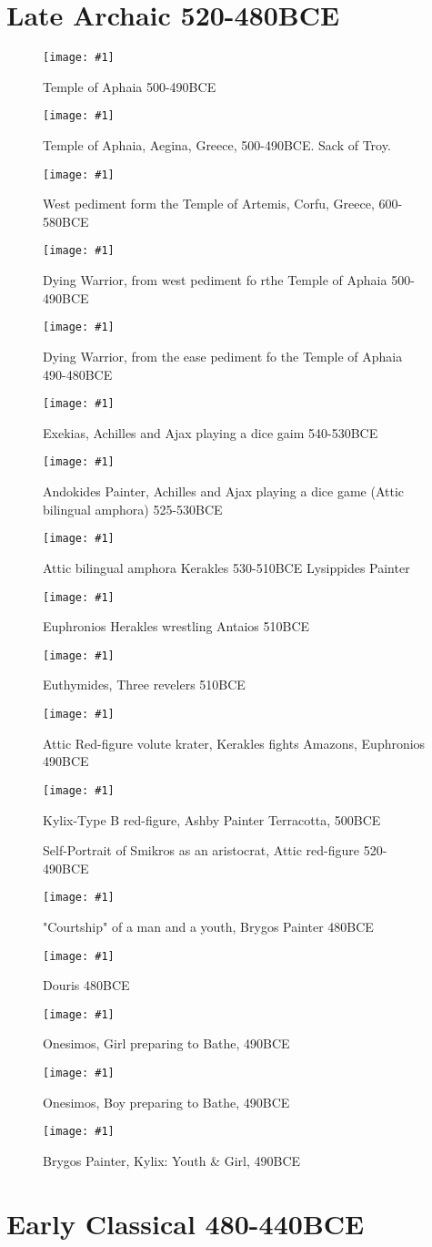 \documentclass{beamer}
\newcommand{\f}[2]{\begin{frame}\begin{figure}\g{#1}\caption{#2}\end{figure}\end{frame}}
\newcommand{\ff}[2]{\begin{frame}\begin{figure}\fbox{\g{#1}}\caption{#2}\end{figure}\end{frame}}
\newcommand{\g}[1]{\texttt{[image: \#1]}}
\begin{document}
\section{Late Archaic 520-480BCE}%
\label{sec:late_archaic_520_480bce}

\f{ppt10/1551558037_1220_02032019_829x609.png}{Temple of Aphaia 500-490BCE}
\f{ppt10/1551558046_1220_02032019_744x485.png}{Temple of Aphaia, Aegina,
Greece, 500-490BCE. Sack of Troy.}
\f{ppt10/1551558054_1220_02032019_876x193.png}{West pediment form the Temple of
Artemis, Corfu, Greece, 600-580BCE}
\f{ppt10/1551558064_1221_02032019_873x319.png}{Dying Warrior, from west
pediment fo rthe Temple of Aphaia 500-490BCE}
\f{ppt10/1551558077_1221_02032019_873x648.png}{Dying Warrior, from the ease
pediment fo the Temple of Aphaia 490-480BCE}
\f{ppt10/1551558104_1221_02032019_707x502.png}{Exekias, Achilles and Ajax
playing a dice gaim 540-530BCE}
\f{ppt10/1551558128_1222_02032019_381x578.png}{Andokides Painter, Achilles and
Ajax playing a dice game (Attic bilingual amphora) 525-530BCE}
\f{ppt10/1551558138_1222_02032019_871x547.png}{Attic bilingual amphora Kerakles
530-510BCE Lysippides Painter}
\f{ppt10/1551558147_1222_02032019_801x489.png}{Euphronios Herakles wrestling
Antaios 510BCE}
\f{ppt10/1551558154_1222_02032019_413x620.png}{Euthymides, Three revelers
510BCE}
\f{ppt10/1551558171_1222_02032019_500x642.png}{Attic Red-figure volute krater,
  Kerakles fights Amazons, Euphronios 490BCE}
  \f{ppt10/1551558185_1223_02032019_837x406.png}{Kylix-Type B red-figure,
  Ashby Painter Terracotta, 500BCE}
\ff{ppt10/1551558204_1223_02032019_830x478.png}{Self-Portrait of Smikros as an
aristocrat, Attic red-figure 520-490BCE}
\f{ppt10/1551558219_1223_02032019_630x448.png}{"Courtship" of a man and a
youth, Brygos Painter 480BCE}
\f{ppt10/1551558229_1223_02032019_719x476.png}{Douris 480BCE}
\f{ppt10/1551558243_1224_02032019_502x645.png}{Onesimos, Girl preparing to
Bathe, 490BCE}
\f{ppt10/1551558266_1224_02032019_475x644.png}{Onesimos, Boy preparing to
Bathe, 490BCE}
\f{ppt10/1551558274_1224_02032019_625x649.png}{Brygos Painter, Kylix: Youth \&
Girl, 490BCE}

\section{Early Classical 480-440BCE}%
\label{sec:early_classical_480_440bce}
\end{document}
